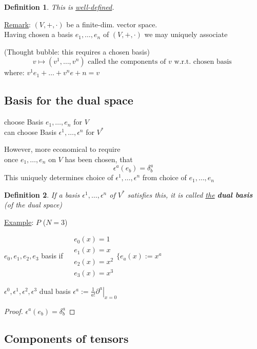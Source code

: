 \documentclass[10pt]{amsart}
\newtheorem{definition}{Definition}
\begin{document}
\begin{multicols*}{2}
\begin{definition}
	This is \underline{well-defined}.
\end{definition}

\underline{Remark}: $(V,+,\cdot)$ be a finite-dim. vector space.   \\
Having chosen a basis $e_1, \dots, e_n$ of $(V,+,\cdot)$ we may uniquely associate

(Thought bubble: this requires a chosen basis)
\[
v \mapsto (v^1 , \dots , v^n)  \text{ called the components of $v$ w.r.t. chosen basis }
\]
where: $v^1 e_1 + \dots + v^n e+n = v$

\subsection{Basis for the dual space}

choose Basis $e_1, \dots, e_n$ for $V$ \\
can choose Basis $\epsilon^1, \dots , \epsilon^n$ for $V^*$

However, more economical to require \\
once $e_1 , \dots , e_n$ on $V$ has been chosen, that
\[
\epsilon^a(e_b) = \delta^a_b
\]
This uniquely determines choice of $\epsilon^1, \dots , \epsilon^n$ from choice of $e_1, \dots , e_n$

\begin{definition}
	If a basis $\epsilon^1, \dots , \epsilon^n$ of $V^*$ satisfies this, it is called \underline{the} \textbf{dual basis} (of the dual space)
\end{definition}

\underline{Example}: $P$ ($N=3$)

$e_0, e_1, e_2, e_3$ basis if $\begin{aligned} & e_0(x) = 1 \\ 
& e_1(x) = x \\ 
& e_2(x) = x^2 \\ 
& e_3(x) = x^3 \end{aligned} \lbrace e_a(x):=x^a$

$\epsilon^0, \epsilon^1, \epsilon^2, \epsilon^3$ dual basis $\epsilon^a := \frac{1}{a!} \left. \partial^a \right|_{x=0}$

\begin{proof}
	$\epsilon^a(e_b) = \delta^a_b$
\end{proof}

\subsection{Components of tensors}


\end{multicols*}
\end{document}
